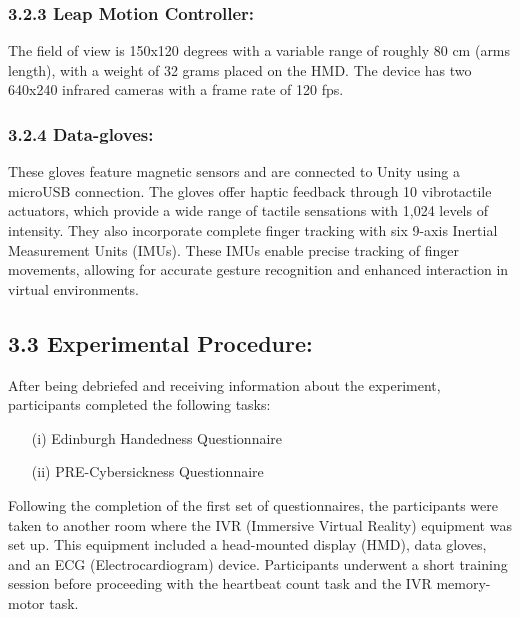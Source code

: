 \documentclass[12pt,oneside,openright]{report}
\begin{document}
\subsubsection*{3.2.3 Leap Motion Controller:}  The field of view is 150x120 degrees with a variable range of roughly 80 cm (arms length), with a weight of 32 grams placed on the HMD. The device has two 640x240 infrared cameras with a frame rate of 120 fps. 
\subsubsection*{3.2.4 Data-gloves:}  These gloves feature magnetic sensors and are connected to Unity using a microUSB connection. The gloves offer haptic feedback through 10 vibrotactile actuators, which provide a wide range of tactile sensations with 1,024 levels of intensity. They also incorporate complete finger tracking with six 9-axis Inertial Measurement Units (IMUs). These IMUs enable precise tracking of finger movements, allowing for accurate gesture recognition and enhanced interaction in virtual environments.

\subsection*{3.3 Experimental Procedure:}

After being debriefed and receiving information about the experiment, participants completed the following tasks:

\begin{enumerate}
\item[(i)] Edinburgh Handedness Questionnaire
\item[(ii)] PRE-Cybersickness Questionnaire
\end{enumerate}

Following the completion of the first set of questionnaires, the participants were taken to another room where the IVR (Immersive Virtual Reality) equipment was set up. This equipment included a head-mounted display (HMD), data gloves, and an ECG (Electrocardiogram) device. Participants underwent a short training session before proceeding with the heartbeat count task and the IVR memory-motor task.
\end{document}
